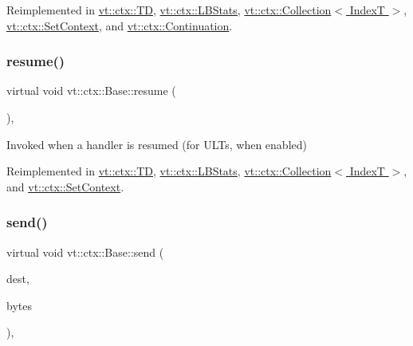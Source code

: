 Reimplemented in \hyperlink{structvt_1_1ctx_1_1_t_d_a5131b9af6b389c90c1ac908c7dcc59b9}{vt\+::ctx\+::\+TD}, \hyperlink{structvt_1_1ctx_1_1_l_b_stats_a55efc4d1d6eb579943b5b39d2a823328}{vt\+::ctx\+::\+L\+B\+Stats}, \hyperlink{structvt_1_1ctx_1_1_collection_afbbbbaa3a85469b7ddded1ded70bd83d}{vt\+::ctx\+::\+Collection$<$ Index\+T $>$}, \hyperlink{structvt_1_1ctx_1_1_set_context_a17029268846a24e61fa35339e9bdcc10}{vt\+::ctx\+::\+Set\+Context}, and \hyperlink{structvt_1_1ctx_1_1_continuation_aab0f231b54f257740a902a6b3258a33a}{vt\+::ctx\+::\+Continuation}.

\mbox{\label{structvt_1_1ctx_1_1_base_a303afabb40ed83057fbe30c744db95da}} 
\subsubsection{\texorpdfstring{resume()}{resume()}}
{\footnotesize\ttfamily virtual void vt\+::ctx\+::\+Base\+::resume (\begin{DoxyParamCaption}{ }\end{DoxyParamCaption})\hspace{0.3cm}{\ttfamily [inline]}, {\ttfamily [virtual]}}



Invoked when a handler is resumed (for U\+L\+Ts, when enabled) 



Reimplemented in \hyperlink{structvt_1_1ctx_1_1_t_d_aa21b5afe01312244e338eefecde83bc6}{vt\+::ctx\+::\+TD}, \hyperlink{structvt_1_1ctx_1_1_l_b_stats_a099850f1bd53aafe650ed9e3958ca54b}{vt\+::ctx\+::\+L\+B\+Stats}, \hyperlink{structvt_1_1ctx_1_1_collection_a4cf87cf7d38bd8d4706ffda41e31c9c6}{vt\+::ctx\+::\+Collection$<$ Index\+T $>$}, and \hyperlink{structvt_1_1ctx_1_1_set_context_a5d0e979f3d601900223d0db9bb8992d3}{vt\+::ctx\+::\+Set\+Context}.

\mbox{\label{structvt_1_1ctx_1_1_base_a8b641dd9a36fc6b60a6ac35e0126076d}} 
\subsubsection{\texorpdfstring{send()}{send()}}
{\footnotesize\ttfamily virtual void vt\+::ctx\+::\+Base\+::send (\begin{DoxyParamCaption}\item[{\hyperlink{structvt_1_1elm_1_1_element_i_d_struct}{elm\+::\+Element\+I\+D\+Struct}}]{dest,  }\item[{\hyperlink{namespacevt_a408e86a8c7c89309b52907dc5a513924}{Msg\+Size\+Type}}]{bytes }\end{DoxyParamCaption})\hspace{0.3cm}{\ttfamily [inline]}, {\ttfamily [virtual]}}



